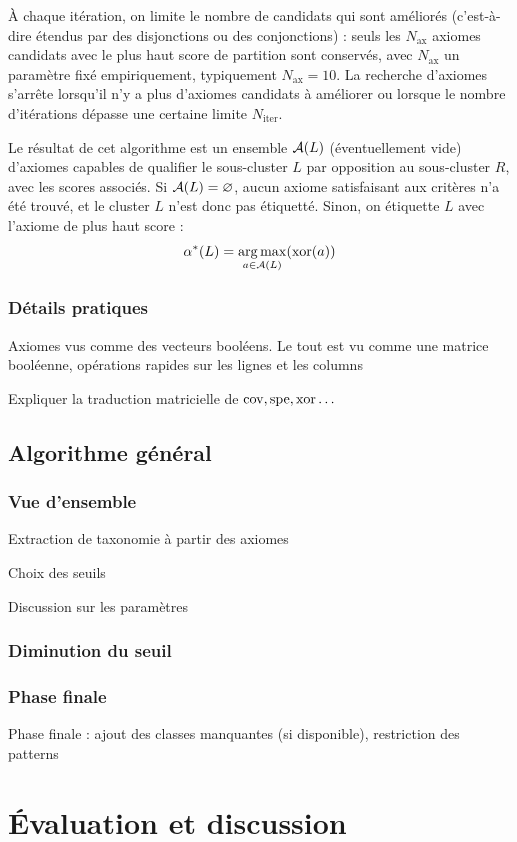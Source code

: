 À chaque itération, on limite le nombre de candidats qui sont améliorés (c'est-à-dire étendus par des disjonctions ou des conjonctions) : seuls les $N_\text{ax}$ axiomes candidats avec le plus haut score de partition sont conservés, avec $N_\text{ax}$ un paramètre fixé empiriquement, typiquement $N_\text{ax} = 10$. La recherche d'axiomes s'arrête lorsqu'il n'y a plus d'axiomes candidats à améliorer ou lorsque le nombre d'itérations dépasse une certaine limite $N_\text{iter}$.

Le résultat de cet algorithme est un ensemble $\cal{A}(L)$ (éventuellement vide) d'axiomes capables de qualifier le sous-cluster $L$ par opposition au sous-cluster $R$, avec les scores associés. Si $\cal{A}(L) = \varnothing$, aucun axiome satisfaisant aux critères n'a été trouvé, et le cluster $L$ n'est donc pas étiquetté. Sinon, on étiquette $L$ avec l'axiome de plus haut score :
\begin{equation}
    \alpha^*(L) = \argmax_{a \in \cal{A}(L)}(\xscore(a))
\end{equation}


\subsubsection{Détails pratiques}

Axiomes vus comme des vecteurs booléens. Le tout est vu comme une matrice booléenne, opérations rapides sur les lignes et les columns

Expliquer la traduction matricielle de $\cov, \spe, \xscore \ldots$


\subsection{Algorithme général}
\subsubsection{Vue d'ensemble}

Extraction de taxonomie à partir des axiomes

Choix des seuils

Discussion sur les paramètres

\subsubsection{Diminution du seuil}

\subsubsection{Phase finale}

Phase finale : ajout des classes manquantes (si disponible), restriction des patterns


\section{Évaluation et discussion}






